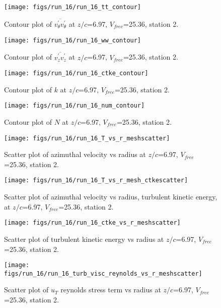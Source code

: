 \begin{figure}[H]
\centering
\texttt{[image: figs/run\_16/run\_16\_tt\_contour]}
\caption{Contour plot of $\overline{v_{\theta}^{\prime} v_{\theta}^{\prime}}$ at $z/c$=6.97, $V_{free}$=25.36, station 2.}
\end{figure}


\begin{figure}[H]
\centering
\texttt{[image: figs/run\_16/run\_16\_ww\_contour]}
\caption{Contour plot of $\overline{v_{z}^{\prime} v_{z}^{\prime}}$ at $z/c$=6.97, $V_{free}$=25.36, station 2.}
\end{figure}


\begin{figure}[H]
\centering
\texttt{[image: figs/run\_16/run\_16\_ctke\_contour]}
\caption{Contour plot of $k$ at $z/c$=6.97, $V_{free}$=25.36, station 2.}
\end{figure}


\begin{figure}[H]
\centering
\texttt{[image: figs/run\_16/run\_16\_num\_contour]}
\caption{Contour plot of $N$ at $z/c$=6.97, $V_{free}$=25.36, station 2.}
\end{figure}


\begin{figure}[H]
\centering
\texttt{[image: figs/run\_16/run\_16\_T\_vs\_r\_meshscatter]}
\caption{Scatter plot of azimuthal velocity vs radius at $z/c$=6.97, $V_{free}$=25.36, station 2.}
\end{figure}


\begin{figure}[H]
\centering
\texttt{[image: figs/run\_16/run\_16\_T\_vs\_r\_mesh\_ctkescatter]}
\caption{Scatter plot of azimuthal velocity vs radius, turbulent kinetic energy, at $z/c$=6.97, $V_{free}$=25.36, station 2.}
\end{figure}


\begin{figure}[H]
\centering
\texttt{[image: figs/run\_16/run\_16\_ctke\_vs\_r\_meshscatter]}
\caption{Scatter plot of turbulent kinetic energy vs radius at $z/c$=6.97, $V_{free}$=25.36, station 2.}
\end{figure}


\begin{figure}[H]
\centering
\texttt{[image: figs/run\_16/run\_16\_turb\_visc\_reynolds\_vs\_r\_meshscatter]}
\caption{Scatter plot of $
u_T$ reynolds stress term vs radius at $z/c$=6.97, $V_{free}$=25.36, station 2.}
\end{figure}


